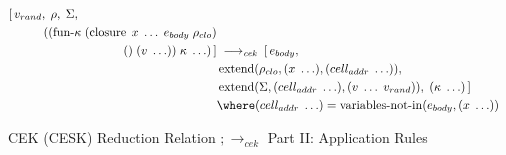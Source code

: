 \begin{figure}
{\begin{minipage}{\textwidth}
\begin{align*}
        [\,v_{rand},\;\rho,\;\Sigma, \hspace{4cm} \\
        ((\operatorname{fun-\kappa}\;(\operatorname{closure}\;x\;\ldots\;e_{body}\;\rho_{clo})\\
        ()\;(v\;\ldots))\;\kappa\;\ldots)\,] &\;\longrightarrow_{\textit{cek}}\;
        [\,e_{body},\\
        & \operatorname{extend}(\rho_{clo},(x\;\ldots),(cell_{addr}\;\ldots)),\\
        & \operatorname{extend}(\Sigma,(cell_{addr}\;\ldots),(v\;\ldots\;v_{rand})),\;(\kappa\;\ldots)\,] \\
        & \where (cell_{addr}\;\ldots)=\operatorname{variables-not-in}(e_{body},(x\;\ldots))\\
      \end{align*}
    \end{minipage}%
  }
  \vspace{0.6em}
  \caption{CEK (CESK) Reduction Relation $;\longrightarrow_{\textit{cek}}$ Part II: Application Rules}
  \label{fig:cek-reduction-relation-redacted-application}
\end{figure}
